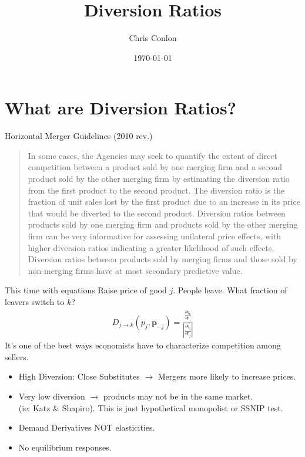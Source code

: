 \documentclass[aspectratio=169,10pt]{beamer}
\title{Diversion Ratios}
\author{Chris Conlon}
\institute{Grad IO}
\date{\today}
\begin{document}
\frame{\titlepage}
\section{What are Diversion Ratios?} 

\begin{frame}{Horizontal Merger Guidelines (2010 rev.)}
\begin{quote}
In some cases, the Agencies may seek to quantify the extent of direct competition between a product sold by one merging firm and a second product sold by the other merging firm by estimating the diversion ratio from the first product to the second product. The diversion ratio is the \alert{fraction of unit sales lost by the first product due to an increase in its price that would be diverted to the second product}. Diversion ratios between products sold by one merging firm and products sold by the other merging firm can be very informative for assessing unilateral price effects, with \alert{higher diversion ratios indicating a greater likelihood of such effects}. Diversion ratios between products sold by merging firms and those sold by \alert{non-merging firms have at most secondary predictive value.}
\end{quote}
\end{frame}

\begin{frame}{This time with equations}
 Raise price of good $j$. People leave. What fraction of leavers switch to $k$?
\begin{eqnarray*}
D_{j \rightarrow k} (p_j,\symbf{p}_{-j})= \frac{\frac{\partial q_k}{\partial p_j}}{\left|\frac{\partial q_j}{\partial p_j} \right|}
\end{eqnarray*}
It's one of the best ways economists have to characterize competition among sellers.
\begin{itemize}
\item High Diversion: Close Substitutes $\rightarrow$ Mergers more likely to increase prices.
\item Very low diversion $\rightarrow$ products may not be in the same market.\\ (ie: Katz \& Shapiro). This is just hypothetical monopolist or SSNIP test.
\item Demand Derivatives NOT elasticities.
\item No equilibrium responses.
\end{itemize}
\end{frame}
\end{document}
